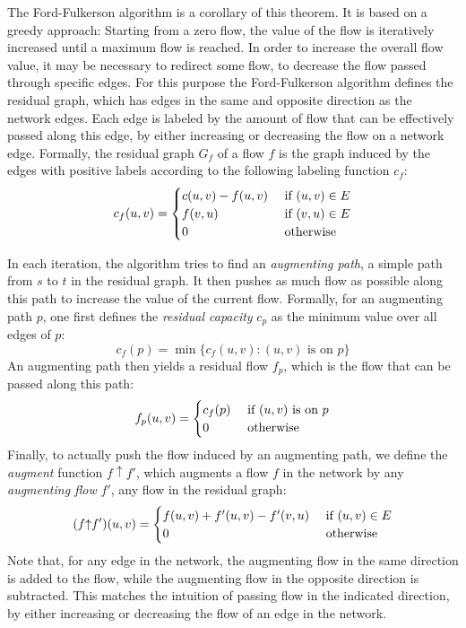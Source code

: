 \documentclass[smallcondensed]{svjour3}     %
\begin{document}
The Ford-Fulkerson algorithm is a corollary of this theorem. It is based on a greedy approach: Starting from a zero flow, the value of the flow is iteratively increased until a maximum flow is reached. In order to increase the overall flow value, it may be necessary to redirect some flow, \ie to decrease the flow passed through specific edges. For this purpose the Ford-Fulkerson algorithm defines the residual graph, which has edges in the same and opposite direction as the network edges.
Each edge is labeled by the amount of flow that can be effectively passed along this edge, by either increasing or decreasing the flow on a network edge.
Formally, the residual graph $G_f$ of a flow $f$ is the graph induced by the 
edges with positive labels according to the following labeling function $c_f$:
\[ c_f (u, v) = 
  \begin{cases}
  c (u, v) - f(u, v) \hfill & \text{ if $(u, v) \in E$} \\
  f (v, u) \hfill & \text{ if $(v, u) \in E$} \\  
  0 \hfill & \text{ otherwise} \\
  \end{cases} 
\]

In each iteration, the algorithm tries to find an \emph{augmenting path}, \ie a simple path from $s$ to $t$ in the residual graph.
It then pushes as much flow as possible along this path to increase the value of the current flow. 
Formally, for an augmenting path $p$, one first defines the \emph{residual capacity} $c_p$ as the minimum value over all edges of $p$:
\[c_f(p) = \min \{c_f(u, v): \text{$(u, v)$ is on  $p$}\}\]
An augmenting path then yields a residual flow $f_p$, which is the flow that can be passed along this path:
\[ f_p (u, v) = 
  \begin{cases}
  c_f(p) \hfill & \text{ if $(u, v)$ is on $p$} \\  
  0 \hfill & \text{ otherwise} \\
  \end{cases} 
\]
\newcommand{\augment}{{\mathbin\uparrow}}%
Finally, to actually push the flow induced by an augmenting path, we define the \emph{augment} function $f\augment f'$, which augments a flow $f$ in the network 
by any \emph{augmenting flow} $f'$, \ie any flow in the residual graph:
\[ (f \augment f') (u, v) = 
  \begin{cases}
  f (u, v) + f'(u, v) - f'(v, u) \hfill & \text{ if $(u, v) \in E$} \\  
  0 \hfill & \text{ otherwise} \\
  \end{cases} 
\]
Note that, for any edge in the network, the augmenting flow in the same direction is added to the flow, while the augmenting flow in the opposite direction is subtracted. 
This matches the intuition of passing flow in the indicated direction, by either increasing or decreasing the flow of an edge in the network.
\end{document}
